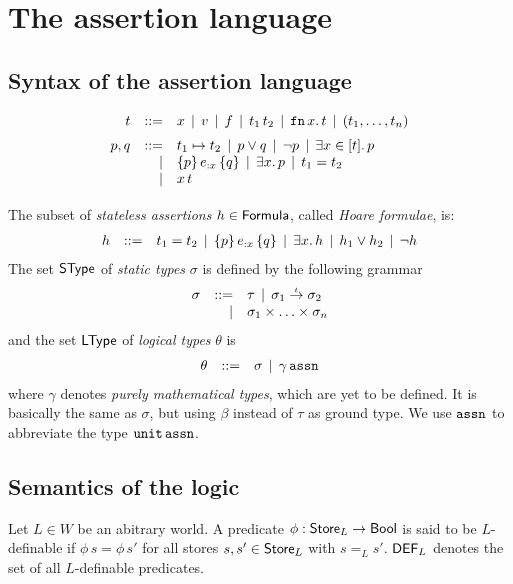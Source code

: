 \documentclass[12pt,a4paper]{report}
\newcommand{\DEF}{\sstyle{DEF}}
\begin{document}

\chapter{The assertion language}



\section{Syntax of the assertion language}

\[\GRbeg
  t \GRis x \GRmid v \GRmid f \GRmid \app{t_1}{t_2} \GRmid \tabstr{x}{t} \GRmid (t_1,\ldots,t_n)
    \GRnl

  p,q \GRis t_1 \mapsto t_2 \GRmid p \vee q \GRmid \neg p \GRmid \qbex{x}{t}{p}
      \GRal \triple{p}{e_{:x}}{q} \GRmid \qex{x}{p} \GRmid t_1 = t_2
      \GRal x\,t
      \GRnl
\GRend\]
The subset of {\em stateless assertions} $h \in \mathsf{Formula}$, called {\em Hoare formulae}, is:
\[\begin{array}{rrlll}
  h & ::= & t_1 = t_2 \,\mid\, \{p\}\,e_{:x}\,\{q\} \,\mid\, \exists{x}.\,{h} \,\mid\, h_1 \vee h_2 \,\mid\, \neg h
\end{array}\]
The set $\mathsf{SType}$ of {\em static types} $\sigma$ is defined by the following grammar
\[\begin{array}{rrlll}
  \sigma & ::= & \tau \,\mid\, \sigma_1\stackrel{_t}{\to}\sigma_2
  \\ & \mid & \sigma_1 \times \ldots \times \sigma_n
\end{array}\]
and the set $\mathsf{LType}$ of {\em logical types} $\theta$ is
\[\begin{array}{rrlll}
  \theta & ::= & \sigma \,\mid\, \gamma\,\mathtt{assn}
\end{array}\]
where $\gamma$ denotes {\em purely mathematical types}, which are yet to be defined. It is basically
the same as $\sigma$, but using $\beta$ instead of $\tau$ as ground type.
We use $\mathtt{assn}$ to abbreviate the type $\mathtt{unit}\,\mathtt{assn}$.



\section{Semantics of the logic}

\begin{definition}[$L$-definability]
  Let $L\in W$ be an abitrary world. A predicate $\phi : \mathsf{Store}_L \to \mathsf{Bool}$ is said to be $L$-definable
  if $\phi\,s = \phi\,s'$ for all stores $s,s' \in \mathsf{Store}_L$ with $s =_L s'$. $\DEF_L$ denotes the set of
  all $L$-definable predicates.
\end{definition}

\end{document}
